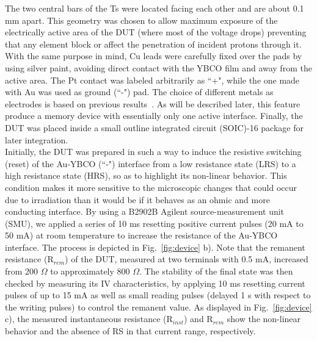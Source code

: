 \documentclass[square,aip,preprint,showkeys,superscriptaddress]{revtex4}
\begin{document}
 
The two central bars of the Ts were located facing each other and are about 0.1 mm apart. This geometry was chosen to allow maximum exposure of the electrically active area of the DUT (where most of the voltage drops) preventing that any element block or affect the penetration of incident protons through it. With the same purpose in mind, Cu leads were carefully fixed over the pads by using silver paint, avoiding direct contact with the YBCO film and away from the active area. The Pt contact was labeled arbitrarily as ``+", while the one made with Au was used as ground (``-") pad. The choice of different metals as electrodes is based on previous results~\cite{Schulman13}.  As will be described later, this feature produce a memory device with essentially only one active interface. Finally, the DUT was placed inside a small outline integrated circuit (SOIC)-16 package for later integration.\\

Initially, the DUT was prepared in such a way to induce the resistive switching (reset) of the Au-YBCO (``-") interface from a low resistance state (LRS) to a high resistance state (HRS), so as to highlight its non-linear behavior. This condition makes it more sensitive to the microscopic changes that could occur due to irradiation than it would be if it behaves as an ohmic and more conducting interface. By using a B2902B Agilent source-measurement unit (SMU), we applied a series of 10 ms resetting positive current pulses (20 mA to 50 mA) at room temperature to increase the resistance of the Au-YBCO interface. The process is depicted in Fig.~\ref{fig:device} b). Note that the remanent resistance (R$_{rem}$) of the DUT, measured at two terminals with 0.5 mA, increased from 200 $\Omega$ to approximately 800 $\Omega$. The stability of the final state was then checked by measuring its IV characteristics, by applying 10 ms resetting current pulses of up to 15 mA as well as small reading pulses (delayed 1 s with respect to the writing pulses) to control the remanent value. As displayed in Fig.~\ref{fig:device} c), the measured instantaneous resistance (R$_{inst}$) and R$_{rem}$ show the non-linear behavior and the absence of RS in that current range, respectively. \\
\end{document}
